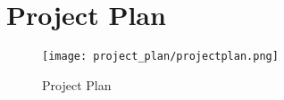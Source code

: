 \chapter{Project Plan}


\begin{figure}[h]
    \centering
    \texttt{[image: project\_plan/projectplan.png]}
    \caption{Project Plan}
    \label{fig:projPlan}
\end{figure}

